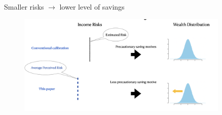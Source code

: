 \documentclass{beamer}
\begin{document}
\begin{frame}{Smaller risks $\rightarrow$ lower level of savings}
\begin{figure}
	\centering
	\label{fig: implication2}
	\includegraphics[width=0.9\textwidth]{figures/implication2.png}
\end{figure}
\end{frame}
\end{document}
